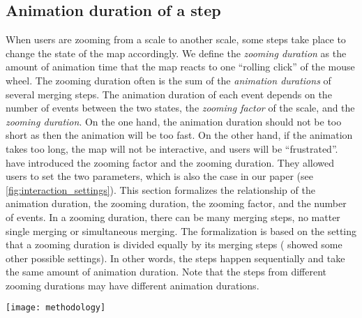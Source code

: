 \documentclass[twocolumn]{svjour3}          %
\begin{document}


\subsection{Animation duration of a step}
\label{sec:zooming_duration}

When users are zooming from a scale to another scale,
some steps take place to change the state of the map accordingly.
We define the \emph{zooming duration} as the amount of 
animation time that the map reacts to one ``rolling click'' of the mouse wheel.
The zooming duration often is the sum of 
the \emph{animation durations} of several merging steps.
The animation duration of each event depends on 
the number of events between the two states,
the \emph{zooming factor} of the scale, and 
the \emph{zooming duration}.
On the one hand, the animation duration should not be too short 
as then the animation will be too fast. 
On the other hand, if the animation takes too long, 
the map will not be interactive, and users will be ``frustrated''.
\citet[][]{Meijers2020Web} 
have introduced the zooming factor and the zooming duration.
They allowed users to set the two parameters,
which is also the case in our paper
(see \fig\ref{fig:interaction_settings}).
This section formalizes the relationship of the animation duration,
the zooming duration, the zooming factor, and the number of events.
In a zooming duration, there can be many merging steps,
no matter single merging or simultaneous merging.
The formalization is based on the setting that
a zooming duration is divided equally by its merging steps
(\citet[][]{Suba2017Thesis} showed some other possible settings).
In other words,
the steps happen sequentially and take the same amount of animation duration.
Note that the steps from different zooming durations 
may have different animation durations.

\begin{figure*}[tb]
\centering
\texttt{[image: methodology]}
\caption{Our panel of settings. 
Among others, one can set how much to zoom when scrolling the mouse wheel 
and set the zooming duration. 
}
\label{fig:interaction_settings}
\end{figure*}
\end{document}
